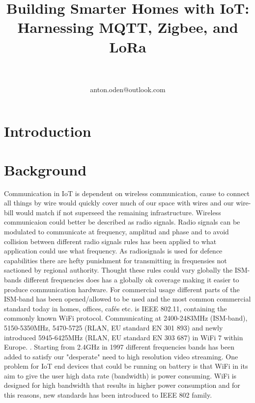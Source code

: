 \documentclass[article,a4paper]{IEEEtran}
\title{Building Smarter Homes with IoT: Harnessing MQTT, Zigbee, and LoRa}
\author{
\IEEEauthorblockN{Anton Odén}\\
\IEEEauthorblockA{Dept. of Maths and Computer Science\\Karlstad University\\
651 88 KARLSTAD, Sweden}\\
anton.oden@outlook.com
}
\begin{document}
\maketitle

    \begin{abstract}
        
    \end{abstract}

    \section{Introduction}

    \section{Background}
    Communication in IoT is dependent on wireless communication, cause to connect all things by wire would quickly cover much of our space with wires and our wire-bill would match if not superseed the remaining infrastructure. Wireless communicaion could better be described as radio signals. Radio signals can be modulated to communicate at frequency, amplitud and phase and to avoid collision between different radio signals rules has been applied to what application could use what frequency. As radiosignals is used for defence capabilities there are hefty punishment \cite{RF-law} for transmitting in frequensies not sactioned by regional authority. Thought these rules could vary globally the ISM-bands different frequencies does has a globally ok coverage making it easier to produce communication hardware. For commercial usage different parts of the ISM-band has been opened/allowed to be used \cite{ISM-band1} and the most common commercial standard today in homes, offices, cafés etc. is IEEE 802.11, containing the commonly known WiFi protocol. Communicating at 2400-2483MHz (ISM-band), 5150-5350MHz, 5470-5725 (RLAN, EU standard EN 301 893) and newly introduced 5945-6425MHz (RLAN, EU standard EN 303 687) in WiFi 7 within Europe. \cite{ISM-bandEUR}. Starting from 2.4GHz in 1997 different frequencies bands has been added to satisfy our "desperate" need to high resolution video streaming. 
    \newline\newline
    One problem for IoT end devices that could be running on battery is that WiFi in its aim to give the user high data rate (bandwidth) is power consuming. WiFi is designed for high bandwidth that results in higher power consumption and for this reasons, new standards has been introduced to IEEE 802 family. 
\end{document}
